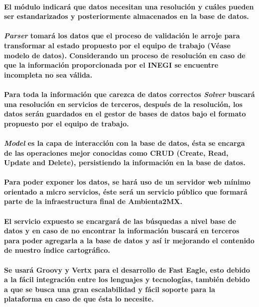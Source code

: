 	  \paragraph{El módulo indicará que datos necesitan una resolución y cuáles pueden ser estandarizados y posteriormente almacenados en la base de datos.}
	  \paragraph{\textbf{\emph{Parser}} tomará los datos que el proceso de validación le arroje para transformar al estado propuesto por el equipo de trabajo (Véase modelo de datos). Considerando un proceso de resolución en caso de que la información proporcionada por el INEGI se encuentre incompleta no sea válida.}
	  \paragraph{Para toda la información que carezca de datos correctos \textbf{\emph{Solver}} buscará una resolución en servicios de terceros, después de la resolución, los datos serán guardados en el gestor de bases de datos bajo el formato propuesto por el equipo de trabajo.}
	  \paragraph{\textbf{\emph{Model}} es la capa de interacción con la base de datos, ésta se encarga de las operaciones mejor conocidas como CRUD (Create, Read, Update and Delete),  persistiendo la información en la base de datos.}
	  \paragraph{Para poder exponer los datos, se hará uso de un servidor web mínimo orientado a micro servicios,  éste será un servicio público que formará parte de la infraestructura final de Ambienta2MX.}
	  \paragraph{El servicio expuesto se encargará de las búsquedas a nivel base de datos y en caso de no encontrar la información buscará en terceros para poder agregarla a la base de datos y así ir mejorando el contenido de nuestro índice cartográfico.}
	  \paragraph{Se usará Groovy y Vertx para el desarrollo de Fast Eagle, esto debido a la fácil integración entre los lenguajes y tecnologías, también debido a que se busca una gran escalabilidad y fácil soporte para la plataforma en caso de que ésta lo necesite.}
